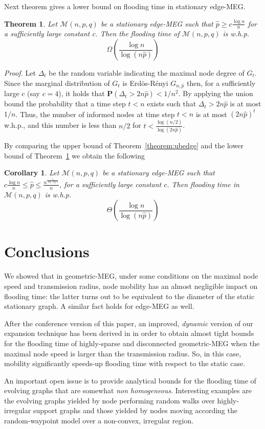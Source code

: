 \documentclass[10pt,a4paper]{article}
\newtheorem{theorem}[definition]{Theorem}
\newtheorem{cor}[definition]{Corollary}
\newcommand{\Prob}[1]{\mathbf{P} \left( #1 \right)}
\newcommand{\proof}{\noindent\textit{Proof. }}
\newcommand{\qed}{\hspace{\stretch{1}$\square$}}
\begin{document}
\noindent Next theorem gives a lower bound on flooding time in stationary edge-MEG.
\begin{theorem}\label{theorem:edgelower}
Let $\mathcal{M}(n,p,q)$ be a stationary edge-MEG such that $\hat{p} \geqslant c \frac{\log n}{n}$ for
a sufficiently large constant $c$. Then the flooding time of $\mathcal{M}(n,p,q)$ is w.h.p.
$$
\Omega\left(\frac{\log n}{\log(n\hat{p})} \right)
$$
\end{theorem}


\proof Let $\Delta_t$ be the random variable indicating the maximal node degree of $G_t$. Since the marginal distribution of $G_t$ is Erd\"os-R\'enyi $G_{n, \hat{p}}$ then, for a sufficiently large $c$ (say $c = 4$), it holds that $\Prob{\Delta_t > 2 n \hat{p}} < 1/n^2$. By applying the union bound the probability that a time step $t < n$ exists such that $\Delta_t > 2 n \hat{p}$ is at most $1/n$. Thus, the number of informed nodes at time step $t < n$ is at most $(2n\hat{p})^t$ w.h.p., and this number is less than $n/2$ for $t < \frac{\log (n/2)}{\log (2n\hat{p})}$.
\qed

\noindent By comparing the upper bound of Theorem~\ref{theorem:ubedge} and the lower bound of
Theorem~\ref{theorem:edgelower} we obtain the following

\begin{cor} Let $\mathcal{M}(n,p,q)$  be a stationary edge-MEG such that $c \frac{\log n}{n} \leqslant \hat{p} \leqslant \frac{n^{\frac{1}{\log\log n}}}{n}$, for a sufficiently large constant $c$. Then flooding time in $\mathcal{M}(n,p,q)$ is w.h.p.
$$
\Theta\left(\frac{\log n}{\log(n\hat{p})} \right)
$$
\end{cor}



\section{Conclusions} \label{sec::concl}
We showed that in geometric-MEG, under some conditions on the maximal node speed and transmission radius, node mobility has an almost negligible impact on flooding time: the latter turns out to be equivalent to the diameter of the static stationary graph. A similar fact holds for edge-MEG as well.

\noindent After the conference version of this paper, an improved, \emph{dynamic} version of our expansion technique has been derived in \cite{CPS09} in order to obtain almost tight bounds for the flooding time of highly-sparse and disconnected geometric-MEG when the maximal node speed is larger than the transmission radius. So, in this case, mobility significantly speeds-up flooding time with respect to the static case.

An important open issue is to provide analytical bounds for the flooding time of evolving graphs that are somewhat
\emph{non homogeneous}. Interesting examples are the evolving graphs yielded by node performing random walks over highly-irregular support graphs and those yielded by nodes moving according the random-waypoint model over a non-convex, irregular region.



\end{document}
